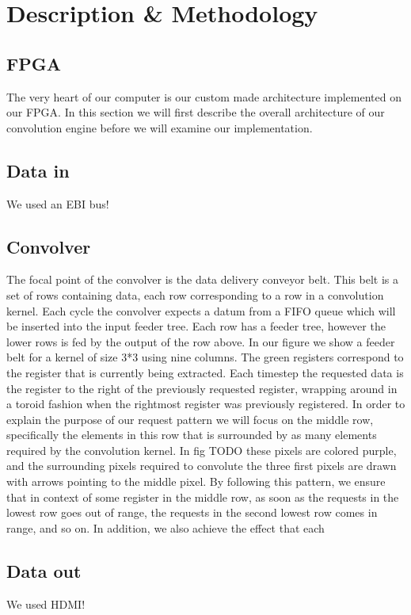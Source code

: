 \chapter{Description \& Methodology}

\section{FPGA}

The very heart of our computer is our custom made architecture implemented on our FPGA.
In this section we will first describe the overall architecture of our convolution engine before we will examine our implementation.

\section{Data in}

We used an EBI bus!

\section{Convolver}

The focal point of the convolver is the data delivery conveyor belt. This belt is a set of rows containing data, each row corresponding to a row in a convolution kernel.
Each cycle the convolver expects a datum from a FIFO queue which will be inserted into the input feeder tree. Each row has a feeder tree, however the lower rows is fed by the output of the row above.
In our figure we show a feeder belt for a kernel of size 3*3 using nine columns. The green registers correspond to the register that is currently being extracted.
Each timestep the requested data is the register to the right of the previously requested register, wrapping around in a toroid fashion when the rightmost register was previously registered.
In order to explain the purpose of our request pattern we will focus on the middle row, specifically the elements in this row that is surrounded by as many elements required by the convolution kernel.
In fig TODO these pixels are colored purple, and the surrounding pixels required to convolute the three first pixels are drawn with arrows pointing to the middle pixel.
By following this pattern, we ensure that in context of some register in the middle row, as soon as the requests in the lowest row goes out of range, the requests in the second lowest row comes in range, and so on.
In addition, we also achieve the effect that each 

\section{Data out}

We used HDMI!

